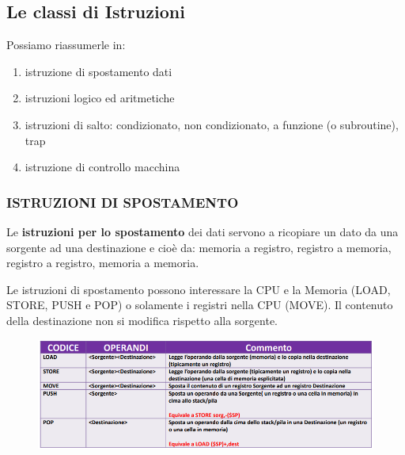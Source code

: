 \documentclass[12pt]{article} %
\begin{document}
\subsection{Le classi di Istruzioni}
Possiamo riassumerle in:
\begin{enumerate}
    \item istruzione di spostamento dati
    \item istruzioni logico ed aritmetiche
    \item istruzioni di salto: condizionato, non condizionato, a funzione (o subroutine), trap
    \item  istruzione di controllo macchina
\end{enumerate}
\par\maketitle\noindent 
\subsubsection{ISTRUZIONI DI SPOSTAMENTO}
Le \textbf{istruzioni per lo spostamento} dei dati servono a ricopiare un dato da una sorgente ad una destinazione e cioè da: memoria a registro, registro a memoria, registro a registro, memoria a memoria.\par\medskip\noindent
Le istruzioni di spostamento possono interessare la CPU e la Memoria (LOAD, STORE, PUSH e POP) o solamente i registri nella CPU (MOVE). Il contenuto della destinazione non si modifica rispetto alla sorgente.
\begin{figure}[h]
    \centering
    \includegraphics[width=1\linewidth]{istruzioni di spostamento.png}
\end{figure}
\newpage
\end{document}
